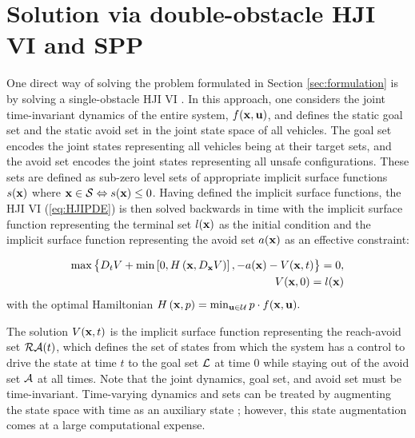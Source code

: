 \section{Solution via double-obstacle HJI VI and SPP\label{sec:solution}}
One direct way of solving the problem formulated in Section \ref{sec:formulation} is by solving a single-obstacle HJI VI \cite{mitchell05,bokanowski10, Margellos11, Margellos13}. In this approach, one considers the joint time-invariant dynamics of the entire system, $f(\mathbf{x},\mathbf{u})$, and defines the static goal set and the static avoid set in the joint state space of all vehicles. The goal set encodes the joint states representing all vehicles being at their target sets, and the avoid set encodes the joint states representing all unsafe configurations. These sets are defined as sub-zero level sets of appropriate implicit surface functions $s(\mathbf{x})$ where $\mathbf{x}\in\mathcal{S} \Leftrightarrow s(\mathbf{x})\le 0$. Having defined the implicit surface functions, the HJI VI (\ref{eq:HJIPDE}) is then solved backwards in time with the implicit surface function representing the terminal set $l(\mathbf{x})$ as the initial condition and the implicit surface function representing the avoid set $a(\mathbf{x})$ as an effective constraint:

\begin{equation}
\begin{aligned}
	\label{eq:HJIPDE}
	\max\big\{D_tV + \min \left[0, H\left(\mathbf{x},D_{\mathbf{x}}V\right)\right], -a(\mathbf{x})-V(\mathbf{x},t) \big\}= 0,\\
V(\mathbf{x},0) = l(\mathbf{x})	 
\end{aligned}
\end{equation}
\noindent with the optimal Hamiltonian $H\left(\mathbf{x},p\right) = \min_{\mathbf{u} \in \mathcal{U}} p \cdot f(\mathbf{x},\mathbf{u}).$

The solution $V(\mathbf{x}, t)$ is the implicit surface function representing the reach-avoid set $\mathcal{RA}(t)$, which defines the set of states from which the system has a control to drive the state at time $t$ to the goal set $\mathcal{L}$ at time $0$ while staying out of the avoid set $\mathcal{A}$ at all times. Note that the joint dynamics, goal set, and avoid set must be time-invariant. Time-varying dynamics and sets can be treated by augmenting the state space with time as an auxiliary state \cite{bokanowski11}; however, this state augmentation comes at a large computational expense.

